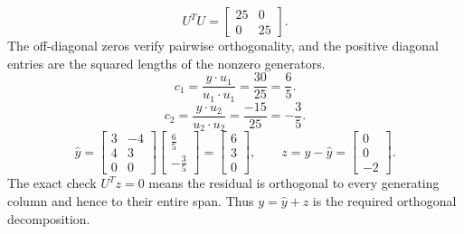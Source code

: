 \[U^TU=\left[\begin{array}{rr}25&0\\0&25\end{array}\right].\]
The off-diagonal zeros verify pairwise orthogonality, and the positive diagonal entries are the squared lengths of the nonzero generators.
\[c_{1}=\frac{y\cdot u_{1}}{u_{1}\cdot u_{1}}=\frac{30}{25}=\frac{6}{5}.\]
\[c_{2}=\frac{y\cdot u_{2}}{u_{2}\cdot u_{2}}=\frac{-15}{25}=- \frac{3}{5}.\]
\[\widehat y=\left[\begin{array}{rr}3&-4\\4&3\\0&0\end{array}\right]\left[\begin{array}{r}\frac{6}{5}\\- \frac{3}{5}\end{array}\right]=\left[\begin{array}{r}6\\3\\0\end{array}\right],\qquad z=y-\widehat y=\left[\begin{array}{r}0\\0\\-2\end{array}\right].\]
The exact check $U^Tz=0$ means the residual is orthogonal to every generating column and hence to their entire span. Thus $y=\widehat y+z$ is the required orthogonal decomposition.


